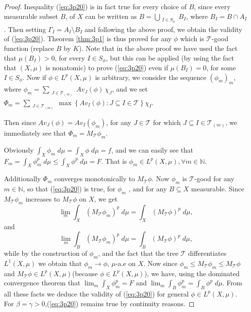 \documentclass[10pt,a4paper]{amsart}
\newcommand{\mc}[1]{\mathcal{#1}}
\begin{document}
\begin{proof}
Inequality (\ref{eq:3p20}) is in fact true for every choice of $B$, since every measurable subset $B$, of $X$ can be written as  $B=\bigcup_{\substack{I\in S_\phi}}B_I$, where $B_I=B\cap A_I$. Then setting $\Gamma_I=A_I\setminus B_I$ and following the above proof, we obtain the validity of (\ref{eq:3p20}). Theorem \ref{thm:3p1} is thus proved for any $\phi$ which is $\mc T$-good function (replace $B$ by $K$). Note that in the above proof we have used the fact that $\mu(B_I)>0$, for every $I\in S_{\phi}$, but this can be applied (by using the fact that $(X, \mu)$ is nonatomic) to prove (\ref{eq:3p20}) even if $\mu(B_I)=0$, for some $I\in S_{\phi}$. Now if $\phi\in L^p(X,\mu)$ is arbitrary, we consider the sequence $(\phi_m)_m$, where $\phi_m=\sum_{\substack{J\in \mc T_{(m)}}} Av_J(\phi)\, \chi_J$, and we set $\Phi_m=\sum_{\substack{J\in \mc T_{(m)}}} \max \left\lbrace Av_I(\phi): J\subseteq I \in \mc T \right\rbrace \chi_I $.

Then since $Av_J(\phi)=Av_I(\phi_m)$, for any $J\in \mc T$ for which $J\subseteq I \in \mc T_{(m)}$, we immediately see that $\Phi_m= M_{\mc T}\phi_m$.

Obviously $\int_X \phi_m \; d\mu=\int_X \phi \; d\mu=f $, and we can easily see that $F_m=\int_X \phi_m^p\;d\mu \leq \int_X \phi^p \;d\mu=F$. That is $\phi_m\in L^p (X,\mu), \forall m\in \mathbb{N}$.

Additionally $\Phi_m$ converges monotonically to $M_{\mc T}\phi$. Now $\phi_m$ is $\mc T$-good for any $m\in \mathbb{N}$, so that (\ref{eq:3p20}) is true, for $\phi_m$ , and for any $B\subseteq X$ measurable. Since $M_{\mc T}\phi_m $ increases to $ M_{\mc T}\phi$ on $X$, we get
\[ \lim_m \int_X \left(M_{\mc T}\phi_m \right)^p\;d\mu = \int_X \left( M_{\mc T}\phi\right)^p \; d\mu, \] and
\[ \lim_m \int_B \left( M_{\mc T}\phi_m \right)^p\; d\mu =\int_B \left( M_{\mc T}\phi \right)^p\;d\mu, \] while by the construction of $\phi_m$, and the fact that the tree $\mc T$ differentiates $L^1(X,\mu)$ we obtain that $\phi_m\longrightarrow \phi$, $\mu$-a.e on $X$. Now since $\phi_m\leq M_{\mc T}\phi_m\leq M_{\mc T}\phi$ and $M_{\mc T}\phi\in L^p(X,\mu)$(because $\phi \in L^p(X,\mu)$), we have, using the dominated convergence theorem that $\lim_m \int_X \phi_m^p=F$ and $\lim_m \int_B \phi_m^p=\int_B \phi^p \; d\mu$. From all these facts we deduce the validity of (\ref{eq:3p20}) for general $\phi\in L^p(X,\mu)$. For $\beta=\gamma>0$,(\ref{eq:3p20}) remains true by continuity reasons.
\end{proof}
\end{document}
